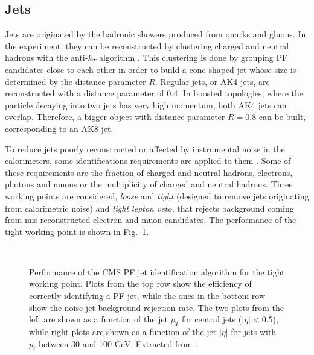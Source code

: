\documentclass[../main.tex]{subfiles}
\begin{document}
\subsection{Jets}
\label{intro:subsec:jets}

Jets are originated by the hadronic showers produced from quarks and gluons. In the experiment, they can be reconstructed by clustering charged and neutral hadrons with the anti-$k_T$ algorithm \cite{intro:id:antikt}. This clustering is done by grouping PF candidates close to each other in order to build a cone-shaped jet whose size is determined by the distance parameter $R$. Regular jets, or AK4 jets, are reconstructed with a distance parameter of 0.4. In boosted topologies, where the particle decaying into two jets has very high momentum, both AK4 jets can overlap. Therefore, a bigger object with distance parameter $R=0.8$ can be built, corresponding to an AK8 jet. 

To reduce jets poorly reconstructed or affected by instrumental noise in the calorimeters, some identifications requirements are applied to them \cite{intro:id:pfjetid}. Some of these requirements are the fraction of charged and neutral hadrons, electrons, photons and muons or the multiplicity of charged and neutral hadrons. Three working points are considered, \textit{loose} and \textit{tight} (designed to remove jets originating from calorimetric noise) and \textit{tight lepton veto}, that rejects background coming from mis-reconstructed electron and muon candidates. The performance of the tight working point is shown in Fig.~\ref{intro:fig:jetid}.

\begin{figure}[h!]
\begin{center}
\\
\end{center}
\caption{Performance of the CMS PF jet identification algorithm for the tight working point. Plots from the top row show the efficiency of correctly identifying a PF jet, while the ones in the bottom row show the noise jet background rejection rate. The two plots from the left are shown as a function of the jet $p_T$ for central jets ($|\eta|<0.5$), while right plots are shown as a function of the jet $|\eta|$ for jets with $p_t$ between 30 and 100 GeV. Extracted from \cite{intro:id:pfjetid}.}
\label{intro:fig:jetid}
\end{figure}
\end{document}
